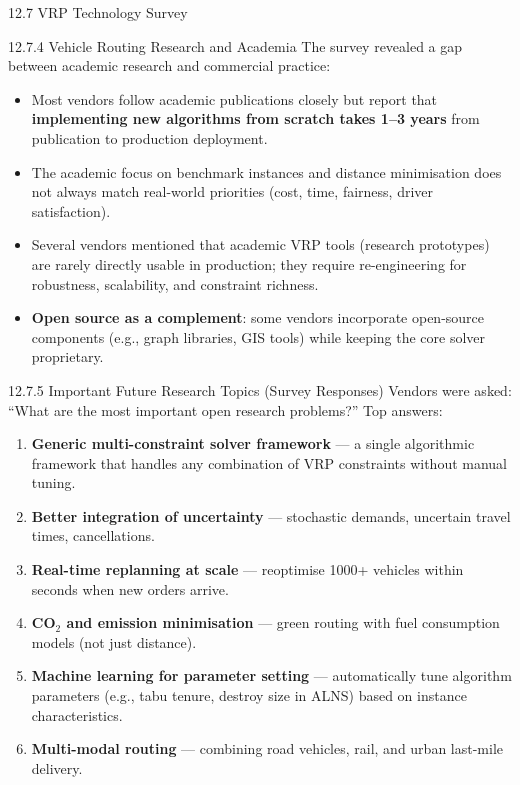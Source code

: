 \documentclass[aspectratio=169,10pt]{beamer}
\begin{document}
\begin{frame}[allowframebreaks]{12.7 \; VRP Technology Survey}
  \begin{block}{12.7.4 \; Vehicle Routing Research and Academia}
    The survey revealed a gap between academic research and commercial practice:
    \begin{itemize}
      \item Most vendors follow academic publications closely but report
            that \textbf{implementing new algorithms from scratch takes 1--3 years}
            from publication to production deployment.
      \item The academic focus on benchmark instances and distance
            minimisation does not always match real-world priorities
            (cost, time, fairness, driver satisfaction).
      \item Several vendors mentioned that academic VRP tools
            (research prototypes) are rarely directly usable
            in production; they require re-engineering for robustness,
            scalability, and constraint richness.
      \item \textbf{Open source as a complement}: some vendors incorporate
            open-source components (e.g., graph libraries, GIS tools) while
            keeping the core solver proprietary.
    \end{itemize}
  \end{block}

  \framebreak

  \begin{block}{12.7.5 \; Important Future Research Topics (Survey Responses)}
    Vendors were asked: ``What are the most important open research problems?''
    Top answers:
    \begin{enumerate}
      \item \textbf{Generic multi-constraint solver framework} ---
            a single algorithmic framework that handles any combination of
            VRP constraints without manual tuning.
      \item \textbf{Better integration of uncertainty} ---
            stochastic demands, uncertain travel times, cancellations.
      \item \textbf{Real-time replanning at scale} ---
            reoptimise 1000+ vehicles within seconds when new orders arrive.
      \item \textbf{CO$_2$ and emission minimisation} ---
            green routing with fuel consumption models (not just distance).
      \item \textbf{Machine learning for parameter setting} ---
            automatically tune algorithm parameters (e.g., tabu tenure,
            destroy size in ALNS) based on instance characteristics.
      \item \textbf{Multi-modal routing} ---
            combining road vehicles, rail, and urban last-mile delivery.
    \end{enumerate}
  \end{block}


\end{frame}
\end{document}
